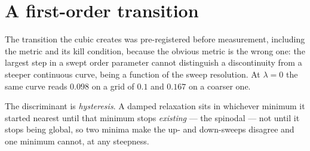 \documentclass[11pt]{article}
\theoremstyle{remark}
\begin{document}
\section{A first-order transition}\label{sec:firstorder}

The transition the cubic creates was pre-registered before measurement, including the
metric and its kill condition, because the obvious metric is the wrong one: the largest
step in a swept order parameter cannot distinguish a discontinuity from a steeper
continuous curve, being a function of the sweep resolution. At $\lambda=0$ the same
curve reads $0.098$ on a grid of $0.1$ and $0.167$ on a coarser one.

The discriminant is \emph{hysteresis}. A damped relaxation sits in whichever minimum it
started nearest until that minimum stops \emph{existing} --- the spinodal --- not until
it stops being global, so two minima make the up- and down-sweeps disagree and one
minimum cannot, at any steepness.
\end{document}
